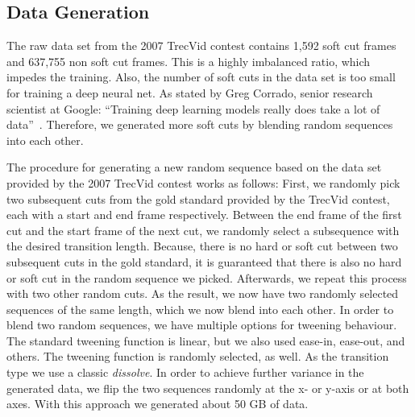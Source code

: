\subsection{Data Generation}
\label{sec:soft_cut_data_generation}

The raw data set from the 2007 TrecVid contest contains 1,592 soft cut frames and 637,755 non soft cut frames.
This is a highly imbalanced ratio, which impedes the training.
Also, the number of soft cuts in the data set is too small for training a deep neural net.
As stated by Greg Corrado, senior research scientist at Google: ``Training deep learning models really does take a lot of data''~\cite{dataDeepNeuralNets}.
Therefore, we generated more soft cuts by blending random sequences into each other.

The procedure for generating a new random sequence based on the data set provided by the 2007 TrecVid contest works as follows:
First, we randomly pick two subsequent cuts from the gold standard provided by the TrecVid contest, each with a start and end frame respectively.
Between the end frame of the first cut and the start frame of the next cut, we randomly select a subsequence with the desired transition length.
Because, there is no hard or soft cut between two subsequent cuts in the gold standard, it is guaranteed that there is also no hard or soft cut in the random sequence we picked.
Afterwards, we repeat this process with two other random cuts.
As the result, we now have two randomly selected sequences of the same length, which we now blend into each other.
In order to blend two random sequences, we have multiple options for tweening behaviour.
The standard tweening function is linear, but we also used ease-in, ease-out, and others. %
The tweening function is randomly selected, as well.
As the transition type we use a classic \textit{dissolve}.
In order to achieve further variance in the generated data, we flip the two sequences randomly at the x- or y-axis or at both axes.
With this approach we generated about 50 GB of data.

